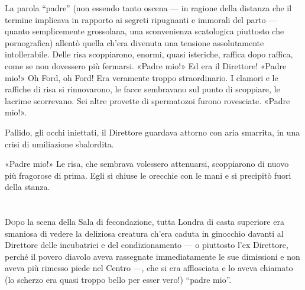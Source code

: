 \documentclass[
a5paper, %
10pt, %
twoside, 
onecolumn, %
openany, %
]{memoir}
\begin{document}
La parola “padre” (non essendo tanto oscena — in ragione della distanza che il termine implicava in rapporto ai segreti ripugnanti e immorali del parto — quanto semplicemente grossolana, una sconvenienza scatologica piuttosto che pornografica) allentò quella ch’era divenuta una tensione assolutamente intollerabile. Delle risa scoppiarono, enormi, quasi isteriche, raffica dopo raffica, come se non dovessero più fermarsi. «Padre mio!» Ed era il Direttore! «Padre mio!» Oh Ford, oh Ford! Era veramente troppo straordinario. I clamori e le raffiche di risa si rinnovarono, le facce sembravano sul punto di scoppiare, le lacrime scorrevano. Sei altre provette di spermatozoi furono rovesciate. «Padre mio!».

Pallido, gli occhi iniettati, il Direttore guardava attorno con aria smarrita, in una crisi di umiliazione sbalordita.

«Padre mio!» Le risa, che sembrava volessero attenuarsi, scoppiarono di nuovo più fragorose di prima. Egli si chiuse le orecchie con le mani e si precipitò fuori della stanza.

\chapter{\phantom{title}}

\lettrine{D}opo la scena della Sala di fecondazione, tutta Londra di casta superiore era smaniosa di vedere la deliziosa creatura ch’era caduta in ginocchio davanti al Direttore delle incubatrici e del condizionamento — o piuttosto l’ex Direttore, perché il povero diavolo aveva rassegnate immediatamente le sue dimissioni e non aveva più rimesso piede nel Centro —, che si era afflosciata e lo aveva chiamato (lo scherzo era quasi troppo bello per esser vero!) “padre mio”.
\end{document}
